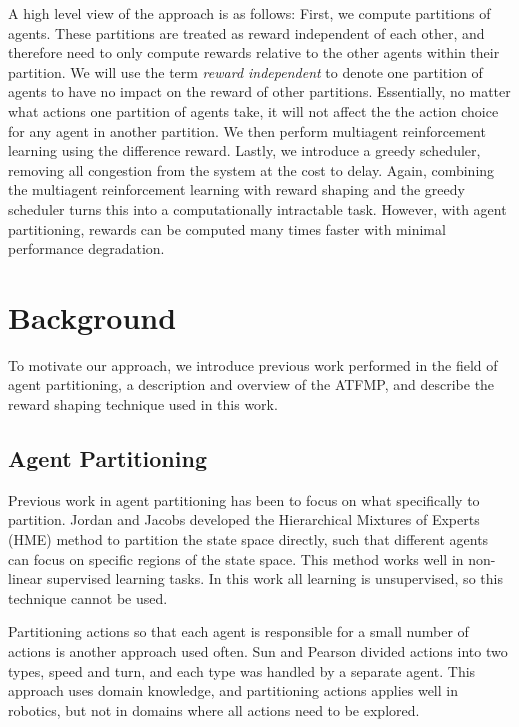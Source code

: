 \documentclass{aamas2014}
\begin{document}
A high level view of the approach is as follows: First, we compute partitions of agents. These partitions are treated as reward independent of each other, and therefore need to only compute rewards relative to the other agents within their partition. We will use the term \textit{reward independent} to denote one partition of agents to have no impact on the reward of other partitions. Essentially, no matter what actions one partition of agents take, it will not affect the the action choice for any agent in another partition. We then perform multiagent reinforcement learning using the difference reward. Lastly, we introduce a greedy scheduler, removing all congestion from the system at the cost to delay. Again, combining the multiagent reinforcement learning with reward shaping and the greedy scheduler turns this into a computationally intractable task. However, with agent partitioning, rewards can be computed many times faster with minimal performance degradation.


\section{Background}
\label{sec:BACKGROUND}

To motivate our approach, we introduce previous work performed in the field of agent partitioning, a description and overview of the ATFMP, and describe the reward shaping technique used in this work.

\subsection{Agent Partitioning}

Previous work in agent partitioning has been to focus on what specifically to partition. Jordan and Jacobs \cite{716791} developed the Hierarchical Mixtures of Experts (HME) method to partition the state space directly, such that different agents can focus on specific regions of the state space. This method works well in non-linear supervised learning tasks. In this work all learning is unsupervised, so this technique cannot be used.

Partitioning actions so that each agent is responsible for a small number of actions is another approach used often. Sun and Pearson \cite{Sun98someexperiments} divided actions into two types, speed and turn, and each type was handled by a separate agent. This approach uses domain knowledge, and partitioning actions applies well in robotics, but not in domains where all actions need to be explored.
\end{document}
